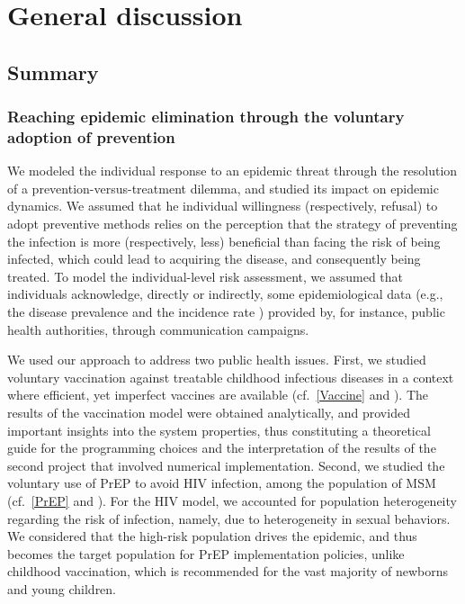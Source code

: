 %
\chapter{General discussion}
\label{Discussion}

\section{Summary}

\subsection{Reaching epidemic elimination through the voluntary adoption of prevention}

We modeled the individual response to an epidemic threat through the resolution of a prevention-versus-treatment dilemma, and studied its impact on epidemic dynamics. We assumed that he individual willingness (respectively, refusal) to adopt preventive methods relies on the perception that the strategy of preventing the infection is more (respectively, less) beneficial than facing the risk of being infected, which could lead to acquiring the disease, and consequently being treated. To model the individual-level risk assessment, we assumed that individuals acknowledge, directly or indirectly, some epidemiological data (e.g., the disease prevalence \cite[]{Jijon2017} and the incidence rate \cite[]{Jijon2021}) provided by, for instance, public health authorities, through communication campaigns. 

We used our approach to address two public health issues. First, we studied voluntary vaccination against treatable childhood infectious diseases in a context where efficient, yet imperfect vaccines are available (cf.~\autoref{Vaccine} and \cite{Jijon2017}). The results of the vaccination model were obtained analytically, and provided important insights into the system properties, thus constituting a theoretical guide for the programming choices and the interpretation of the results of the second project that involved numerical implementation. Second, we studied the voluntary use of PrEP to avoid HIV infection, among the population of MSM (cf.~\autoref{PrEP} and \cite{Jijon2021}). For the HIV model, we accounted for population heterogeneity regarding the risk of infection, namely, due to heterogeneity in sexual behaviors. We considered that the high-risk population drives the epidemic, and thus becomes the target population for PrEP implementation policies, unlike childhood vaccination, which is recommended for the vast majority of newborns and young children. 

